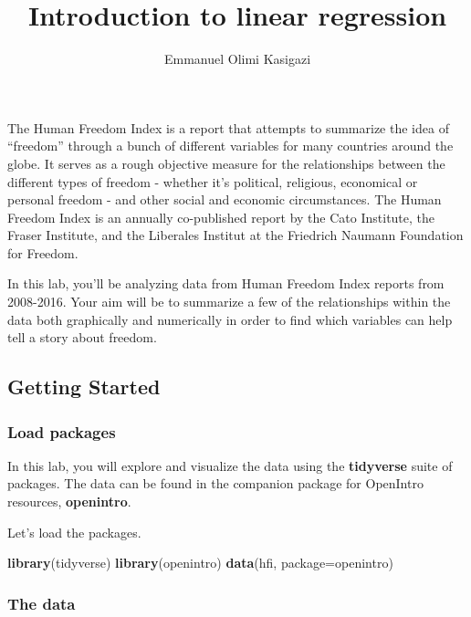 \documentclass[
]{article}
\title{Introduction to linear regression}
\author{Emmanuel Olimi Kasigazi}
\date{}
\newenvironment{Shaded}{\begin{snugshade}}{\end{snugshade}}
\newcommand{\AttributeTok}[1]{\textcolor[rgb]{0.13,0.29,0.53}{#1}}
\newcommand{\FunctionTok}[1]{\textcolor[rgb]{0.13,0.29,0.53}{\textbf{#1}}}
\newcommand{\NormalTok}[1]{#1}
\newcommand{\StringTok}[1]{\textcolor[rgb]{0.31,0.60,0.02}{#1}}
\begin{document}
\maketitle

The Human Freedom Index is a report that attempts to summarize the idea
of ``freedom'' through a bunch of different variables for many countries
around the globe. It serves as a rough objective measure for the
relationships between the different types of freedom - whether it's
political, religious, economical or personal freedom - and other social
and economic circumstances. The Human Freedom Index is an annually
co-published report by the Cato Institute, the Fraser Institute, and the
Liberales Institut at the Friedrich Naumann Foundation for Freedom.

In this lab, you'll be analyzing data from Human Freedom Index reports
from 2008-2016. Your aim will be to summarize a few of the relationships
within the data both graphically and numerically in order to find which
variables can help tell a story about freedom.

\subsection{Getting Started}\label{getting-started}

\subsubsection{Load packages}\label{load-packages}

In this lab, you will explore and visualize the data using the
\textbf{tidyverse} suite of packages. The data can be found in the
companion package for OpenIntro resources, \textbf{openintro}.

Let's load the packages.

\begin{Shaded}
\begin{Highlighting}[]
\FunctionTok{library}\NormalTok{(tidyverse)}
\FunctionTok{library}\NormalTok{(openintro)}
\FunctionTok{data}\NormalTok{(}\StringTok{\textquotesingle{}hfi\textquotesingle{}}\NormalTok{, }\AttributeTok{package=}\StringTok{\textquotesingle{}openintro\textquotesingle{}}\NormalTok{)}
\end{Highlighting}
\end{Shaded}

\subsubsection{The data}\label{the-data}
\end{document}

